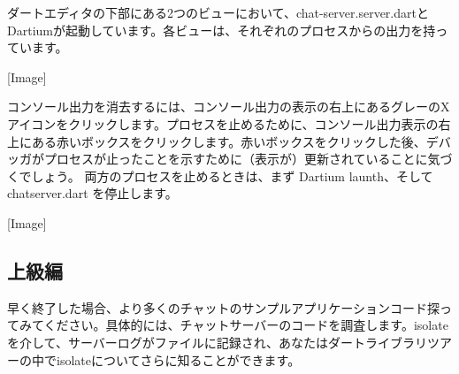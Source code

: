 ダートエディタの下部にある2つのビューにおいて、chat-server.server.dartとDartiumが起動しています。各ビューは、それぞれのプロセスからの出力を持っています。

[Image]

コンソール出力を消去するには、コンソール出力の表示の右上にあるグレーのXアイコンをクリックします。プロセスを止めるために、コンソール出力表示の右上にある赤いボックスをクリックします。赤いボックスをクリックした後、デバッガがプロセスが止ったことを示すために（表示が）更新されていることに気づくでしょう。
両方のプロセスを止めるときは、まず Dartium launth、そして chatserver.dart を停止します。

[Image]

\subsection{上級編}

早く終了した場合、より多くのチャットのサンプルアプリケーションコード探ってみてください。具体的には、チャットサーバーのコードを調査します。isolateを介して、サーバーログがファイルに記録され、あなたはダートライブラリツアーの中でisolateについてさらに知ることができます。
